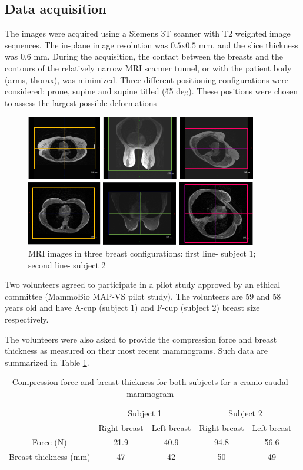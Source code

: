 \subsection{Data acquisition}\label{subsection:imageaquisition}

 The images were acquired using a Siemens 3T scanner with T2 weighted image sequences. The in-plane image resolution was $0.5$x$0.5$ mm, and the slice thickness was 0.6 mm. During the acquisition, the contact between the breasts and the contours of the  relatively narrow MRI scanner tunnel, or with the patient body (arms, thorax), was minimized. Three different positioning configurations were considered: prone, supine and supine titled (\~ 45 deg). These positions were chosen to assess the largest possible deformations
\begin{figure}[H]
\centering
\includegraphics[width=0.9\textwidth,keepaspectratio]{figures/patientData.png} 
\caption{MRI images in three breast configurations: first line- subject 1; second line- subject 2}\label{fig:patientdata}
\end{figure}

Two volunteers agreed to participate in a pilot study approved by an ethical committee (MammoBio MAP-VS pilot study). The volunteers are 59 and 58 years old and have A-cup (subject 1) and F-cup (subject 2) breast size respectively. 
 

The volunteers were also asked to provide the compression force and breast thickness as measured on their most recent mammograms. Such data are summarized in Table \ref{tab:forceandthichnessdata}.
\begin{table}[H]
\centering
\begin{tabular}{c|c|c||c|c|}
\cline{2-5}
&\multicolumn{2}{c||}{Subject 1}&\multicolumn{2}{c|}{Subject 2}\\
\cline{2-5}
& Right breast & Left breast & Right breast & Left breast\\
\cline{2-5}
\hline
\multicolumn{1}{|c||}{Force (N)}  & 21.9 &40.9 &94.8 & 56.6 \\
\hline
\multicolumn{1}{|c||}{ Breast thickness (mm)} & 47 & 42 & 50 & 49 \\
\hline

\end{tabular}
\caption{Compression force and breast thickness for both subjects for a cranio-caudal mammogram}\label{tab:forceandthichnessdata}
\end{table}

